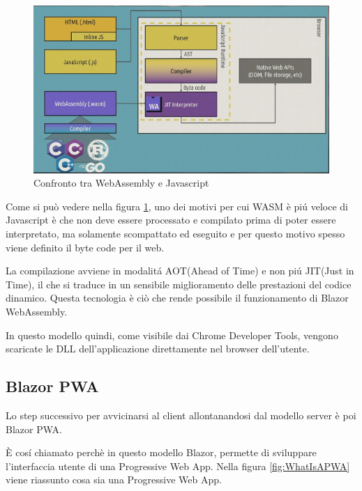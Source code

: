 \begin{figure}[H]
	\centerline{\includegraphics[scale=0.7]{figure/WasmVSJavascript.PNG}}
	\caption{Confronto tra WebAssembly e Javascript}
	\label{fig:WasmVSJavascript}
\end{figure}

Come si pu\`o vedere nella figura \ref{fig:WasmVSJavascript}, uno dei motivi per cui WASM \`e pi\'u veloce di Javascript \`e che non deve essere processato e compilato prima di poter essere interpretato, ma solamente scompattato ed eseguito e per questo motivo spesso viene definito il byte code per il web.

La compilazione avviene in modalit\'a AOT(Ahead of Time) e non pi\'u JIT(Just in Time), il che si traduce in un sensibile miglioramento delle prestazioni del codice dinamico.
Questa tecnologia \`e ci\`o che rende possibile il funzionamento di Blazor WebAssembly.

In questo modello quindi, come visibile dai Chrome Developer Tools, vengono scaricate le DLL dell'applicazione direttamente nel browser dell'utente.

\subsection{Blazor PWA}\label{sez:bpwa}
Lo step successivo per avvicinarsi al client allontanandosi dal modello server \`e poi Blazor PWA.

\`E cos\'i chiamato perch\`e in questo modello Blazor, permette di sviluppare l'interfaccia utente di una Progressive Web App.
Nella figura \ref{fig:WhatIsAPWA} viene riassunto cosa sia una Progressive Web App.

